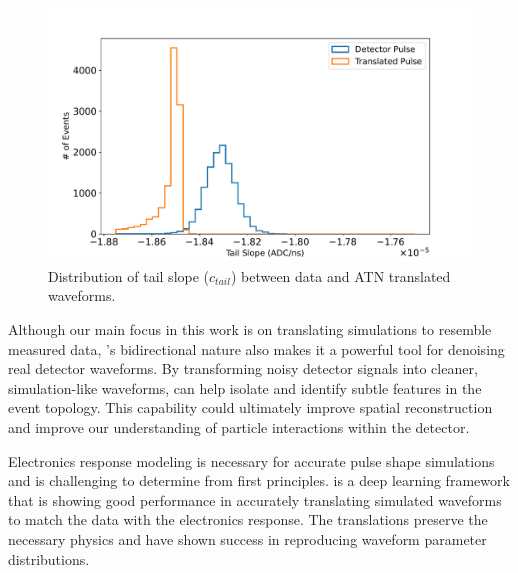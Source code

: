\begin{figure}%
\centering
\includegraphics[width=0.9\linewidth,trim={2pc 0pc 2pc 0pc},clip]{ch8/figs/SEP_ts.pdf}
\caption{Distribution of tail slope ($c_{tail}$) between data and ATN translated waveforms.}
\label{ch8_fig_tail_slope_sim}
\end{figure}

Although our main focus in this work is on translating simulations to resemble measured data, {\cpunet}’s bidirectional nature also makes it a powerful tool for denoising real detector waveforms. By transforming noisy detector signals into cleaner, simulation-like waveforms, {\cpunet} can help isolate and identify subtle features in the event topology. This capability could ultimately improve spatial reconstruction and improve our understanding of particle interactions within the detector.

Electronics response modeling is necessary for accurate pulse shape simulations and is challenging to determine from first principles. {\cpunet} is a deep learning framework that is showing good performance in accurately translating simulated waveforms to match the data with the electronics response. The translations preserve the necessary physics and have shown success in reproducing waveform parameter distributions.
